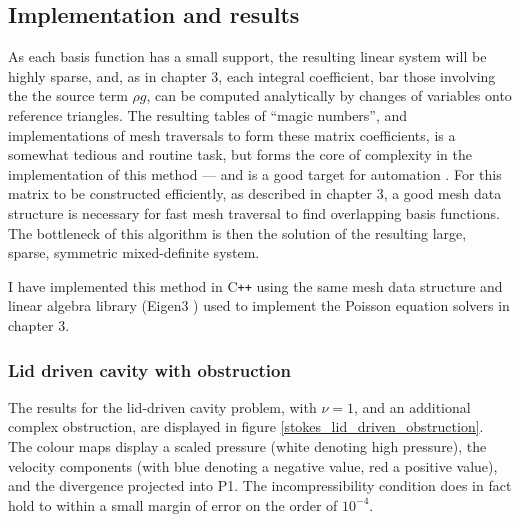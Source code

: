 \subsection{Implementation and results}
As each basis function has a small support, the resulting linear system will be highly sparse, and, as in chapter 3, each integral coefficient, bar
those involving the
the source term $\rho g$, can be computed analytically by changes of variables onto reference triangles. The resulting tables of ``magic numbers'',
and implementations of mesh traversals to form these matrix coefficients, is a somewhat tedious and routine task, but forms the core of complexity
in the implementation of this method --- and is a good target for automation \cite{automating_fem} \cite{fenics_book} \cite{firedrake}. For this matrix to be constructed efficiently, as described in chapter 3, a good mesh data structure is necessary
for fast mesh traversal to find overlapping basis functions. The bottleneck of this algorithm is then the solution of the resulting
large, sparse, symmetric mixed-definite system.

I have implemented this method in C\texttt{++} using the same mesh data structure and linear algebra library (Eigen3 \cite{eigen})
used to implement the Poisson equation solvers in chapter 3.

\subsubsection{Lid driven cavity with obstruction}
The results for the lid-driven cavity problem, with $\nu = 1$, and an additional complex obstruction, are displayed in figure
\ref{stokes_lid_driven_obstruction}.
The colour maps display a scaled pressure (white denoting high pressure), the velocity components
(with blue denoting a negative value, red a positive value), and the divergence projected into P1.
The incompressibility condition does in fact
hold to within a small margin of error on the order of $10^{-4}$.


